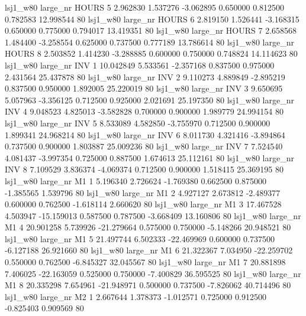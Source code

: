     lsj1_w80   large_nr    HOURS                 5  2.962830  1.537276  -3.062895 0.650000 0.812500  0.782583   12.998544 80
    lsj1_w80   large_nr    HOURS                 6  2.819150  1.526441  -3.168315 0.650000 0.775000  0.794017   13.419351 80
    lsj1_w80   large_nr    HOURS                 7  2.658568  1.484400  -3.258554 0.625000 0.737500  0.777189   13.786614 80
    lsj1_w80   large_nr    HOURS                 8  2.503852  1.414230  -3.288885 0.600000 0.750000  0.748824   14.114623 80
    lsj1_w80   large_nr      INV                 1 10.042849  5.533561  -2.357168 0.837500 0.975000  2.431564   25.437878 80
    lsj1_w80   large_nr      INV                 2  9.110273  4.889849  -2.895219 0.837500 0.950000  1.892005   25.220019 80
    lsj1_w80   large_nr      INV                 3  9.650695  5.057963  -3.356125 0.712500 0.925000  2.021691   25.197350 80
    lsj1_w80   large_nr      INV                 4  9.048523  4.825013  -3.582828 0.700000 0.900000  1.989779   24.994154 80
    lsj1_w80   large_nr      INV                 5  8.533089  4.582850  -3.755970 0.712500 0.900000  1.899341   24.968214 80
    lsj1_w80   large_nr      INV                 6  8.011730  4.321416  -3.894864 0.737500 0.900000  1.803887   25.009236 80
    lsj1_w80   large_nr      INV                 7  7.524540  4.081437  -3.997354 0.725000 0.887500  1.674613   25.112161 80
    lsj1_w80   large_nr      INV                 8  7.109529  3.836374  -4.069374 0.712500 0.900000  1.518415   25.369195 80
    lsj1_w80   large_nr       M1                 1  5.196340  2.726624  -1.769380 0.662500 0.875000 -1.385565    1.539796 80
    lsj1_w80   large_nr       M1                 2  4.927127  2.673812  -2.489377 0.600000 0.762500 -1.618114    2.660620 80
    lsj1_w80   large_nr       M1                 3 17.467528  4.503947 -15.159013 0.587500 0.787500 -3.668409   13.160806 80
    lsj1_w80   large_nr       M1                 4 20.901258  5.739926 -21.279664 0.575000 0.750000 -5.148266   20.948521 80
    lsj1_w80   large_nr       M1                 5 21.497744  6.502333 -22.469969 0.600000 0.737500 -6.127188   26.921660 80
    lsj1_w80   large_nr       M1                 6 21.322367  7.034950 -22.259702 0.550000 0.762500 -6.845327   32.045567 80
    lsj1_w80   large_nr       M1                 7 20.881898  7.406025 -22.163059 0.525000 0.750000 -7.400829   36.595525 80
    lsj1_w80   large_nr       M1                 8 20.335298  7.654961 -21.948971 0.500000 0.737500 -7.826062   40.714496 80
    lsj1_w80   large_nr       M2                 1  2.667644  1.378373  -1.012571 0.725000 0.912500 -0.825403    0.909569 80
